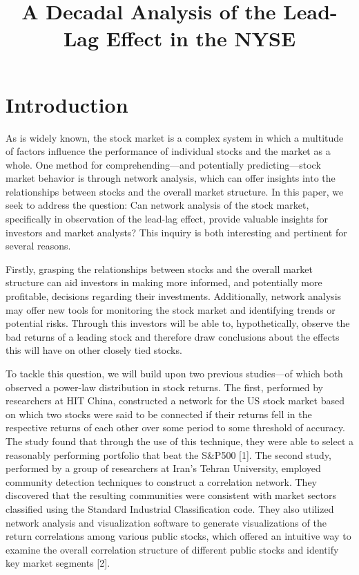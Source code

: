 \documentclass{article}
\title{A Decadal Analysis of the Lead-Lag Effect in the NYSE}
\begin{document}
\maketitle




\section{Introduction}
\large

As is widely known, the stock market is a complex system in which a multitude of factors influence the performance of individual stocks and the market as a whole. One method for comprehending—and potentially predicting—stock market behavior is through network analysis, which can offer insights into the relationships between stocks and the overall market structure. In this paper, we seek to address the question: Can network analysis of the stock market, specifically in observation of the lead-lag effect, provide valuable insights for investors and market analysts? This inquiry is both interesting and pertinent for several reasons.

Firstly, grasping the relationships between stocks and the overall market structure can aid investors in making more informed, and potentially more profitable, decisions regarding their investments. Additionally, network analysis may offer new tools for monitoring the stock market and identifying trends or potential risks. Through this investors will be able to, hypothetically, observe the bad returns of a leading stock and therefore draw conclusions about the effects this will have on other closely tied stocks.

To tackle this question, we will build upon two previous studies—of which both observed a power-law distribution in stock returns. The first, performed by researchers at HIT China, constructed a network for the US stock market based on which two stocks were said to be connected if their returns fell in the respective returns of each other over some period to some threshold of accuracy. The study found that through the use of this technique, they were able to select a reasonably performing portfolio that beat the S\&P500 [1]. The second study, performed by a group of researchers at Iran's Tehran University, employed community detection techniques to construct a correlation network. They discovered that the resulting communities were consistent with market sectors classified using the Standard Industrial Classification code. They also utilized network analysis and visualization software to generate visualizations of the return correlations among various public stocks, which offered an intuitive way to examine the overall correlation structure of different public stocks and identify key market segments [2].
\end{document}
